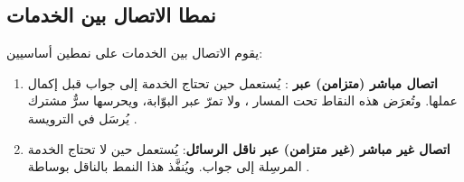 \subsection{نمطا الاتصال بين الخدمات}

يقوم الاتصال بين الخدمات على نمطين أساسيين:

\begin{enumerate}
  \item \textbf{اتصال مباشر (متزامن) عبر }: يُستعمل حين تحتاج الخدمة إلى جواب قبل إكمال عملها. وتُعرَض هذه النقاط تحت المسار ، ولا تمرّ عبر البوّابة، ويحرسها سرٌّ مشترك يُرسَل في الترويسة .
  \item \textbf{اتصال غير مباشر (غير متزامن) عبر ناقل الرسائل}: يُستعمل حين لا تحتاج الخدمة المرسِلة إلى جواب. ويُنفَّذ هذا النمط بالناقل  بوساطة .
\end{enumerate}

